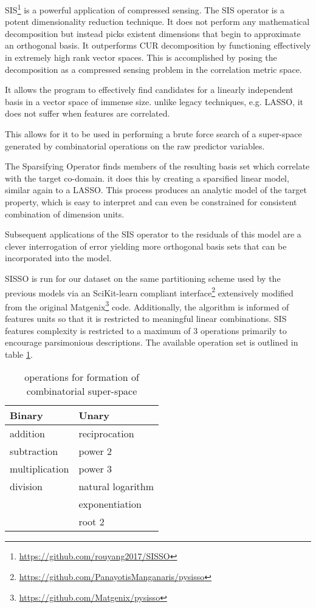SIS\footnote{\url{https://github.com/rouyang2017/SISSO}} is a powerful application of compressed sensing.
\autocite{ghiringhelli-2017-learn-physic}
The SIS operator is a potent dimensionality reduction technique.
It does not perform any mathematical decomposition but instead picks existent dimensions that begin to approximate an orthogonal basis.
It outperforms CUR decomposition by functioning effectively in extremely high rank vector spaces.
\autocite{ray-2021-various-dimen,hamm-2019-cur-decom}
This is accomplished by posing the decomposition as a compressed sensing problem in the correlation metric space.

It allows the program to effectively find candidates for a linearly independent basis in a vector space of immense size.
unlike legacy techniques, e.g.
LASSO, it does not suffer when features are correlated.
\autocite{tibshirani-1996-regres-shrin,gauraha-2018-introd-to-lasso}

This allows for it to be used in performing a brute force search of a super-space generated by combinatorial operations on the raw predictor variables.

The Sparsifying Operator finds members of the resulting basis set which correlate with the target co-domain.
it does this by creating a sparsified linear model, similar again to a LASSO.
This process produces an analytic model of the target property, which is easy to interpret and can even be constrained for consistent combination of dimension units.

Subsequent applications of the SIS operator to the residuals of this model are a clever interrogation of error yielding more orthogonal basis sets that can be incorporated into the model.
\autocite{mayo-1998-error-growt}

SISSO is run for our dataset on the same partitioning scheme used by the previous models via an SciKit-learn compliant \autocite{buitinck-2013-api} interface\footnote{\url{https://github.com/PanayotisManganaris/pysisso}} extensively modified from the original Matgenix\footnote{\url{https://github.com/Matgenix/pysisso}} code.
Additionally, the algorithm is informed of features units so that it is restricted to meaningful linear combinations.
SIS features complexity is restricted to a maximum of 3 operations primarily to encourage parsimonious descriptions.
The available operation set is outlined in table \ref{tbl:ops}.

\begin{table}[htbp]
\caption{\label{tbl:ops} operations for formation of combinatorial super-space}
\centering
\begin{tabular}{ll}
Binary & Unary\\[0pt]
\hline
addition & reciprocation\\[0pt]
subtraction & power 2\\[0pt]
multiplication & power 3\\[0pt]
division & natural logarithm\\[0pt]
 & exponentiation\\[0pt]
 & root 2\\[0pt]
\end{tabular}
\end{table}

